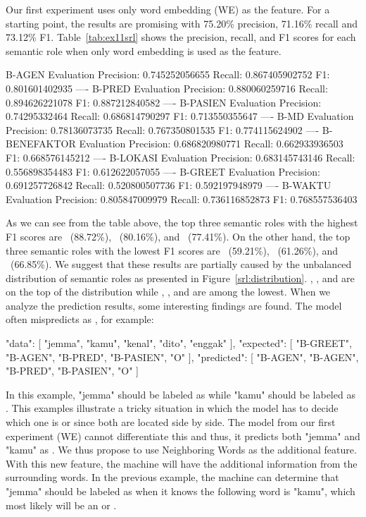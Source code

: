 Our first experiment uses only word embedding (WE) as the feature. For a starting point, the results are promising with 75.20\% precision, 71.16\% recall and 73.12\% F1. Table~\ref{tab:ex11srl} shows the precision, recall, and F1 scores for each semantic role when only word embedding is used as the feature.

B-AGEN Evaluation
Precision:  0.745252056655
Recall:  0.867405902752
F1:  0.801601402935
----
B-PRED Evaluation
Precision:  0.880060259716
Recall:  0.894626221078
F1:  0.887212840582
----
B-PASIEN Evaluation
Precision:  0.74295332464
Recall:  0.686814790297
F1:  0.713550355647
----
B-MD Evaluation
Precision:  0.78136073735
Recall:  0.767350801535
F1:  0.774115624902
----
B-BENEFAKTOR Evaluation
Precision:  0.686820980771
Recall:  0.662933936503
F1:  0.668576145212
----
B-LOKASI Evaluation
Precision:  0.683145743146
Recall:  0.556898354483
F1:  0.612622057055
----
B-GREET Evaluation
Precision:  0.691257726842
Recall:  0.520800507736
F1:  0.592197948979
----
B-WAKTU Evaluation
Precision:  0.805847009979
Recall:  0.736116852873
F1:  0.768557536403

As we can see from the table above, the top three semantic roles with the highest F1 scores are \predicate~(88.72\%), \agent~(80.16\%), and \modal~(77.41\%). On the other hand, the top three semantic roles with the lowest F1 scores are \greet~(59.21\%), \location~(61.26\%), and \beneficiary~(66.85\%). We suggest that these results are partially caused by the unbalanced distribution of semantic roles as presented in Figure~\ref{srl:distribution}. \predicate, \agent, and \modal are on the top of the distribution while \greet, \location, and \beneficiary are among the lowest. When we analyze the prediction results, some interesting findings are found. The model often mispredicts \greet as \agent, for example:

"data": [
"jemma",
"kamu",
"kenal",
"dito",
"enggak"
],
"expected": [
"B-GREET",
"B-AGEN",
"B-PRED",
"B-PASIEN",
"O"
],
"predicted": [
"B-AGEN",
"B-AGEN",
"B-PRED",
"B-PASIEN",
"O"
]

In this example, "jemma" should be labeled as \greet while "kamu" should be labeled as \agent. This examples illustrate a tricky situation in which the model has to decide which one is \agent or \greet since both are located side by side. The model from our first experiment (WE) cannot differentiate this and thus, it predicts both "jemma" and "kamu" as \agent. We thus propose to use Neighboring Words as the additional feature. With this new feature, the machine will have the additional information from the surrounding words. In the previous example, the machine can determine that "jemma" should be labeled as \greet when it knows the following word is "kamu", which most likely will be an \agent or \patient.

